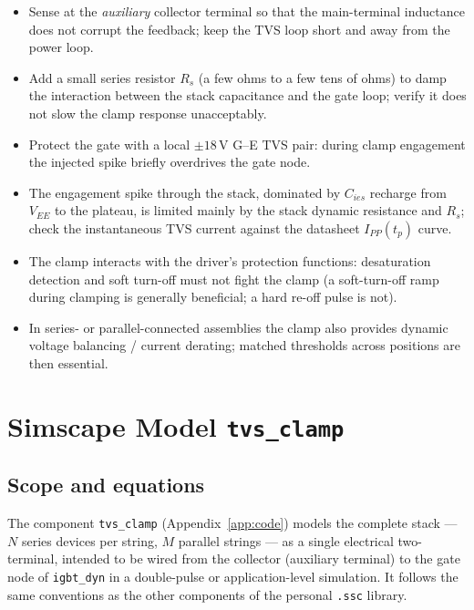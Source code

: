 \documentclass[11pt,a4paper]{article}
\begin{document}
\begin{itemize}
  \item Sense at the \emph{auxiliary} collector terminal so that the
        main-terminal inductance does not corrupt the feedback; keep
        the TVS loop short and away from the power loop.
  \item Add a small series resistor $R_s$ (a few ohms to a few tens of
        ohms) to damp the interaction between the stack capacitance and
        the gate loop; verify it does not slow the clamp response
        unacceptably.
  \item Protect the gate with a local $\pm18$\,V G--E TVS pair: during
        clamp engagement the injected spike briefly overdrives the
        gate node.
  \item The engagement spike through the stack, dominated by
        $C_{ies}$ recharge from $V_{EE}$ to the plateau, is limited
        mainly by the stack dynamic resistance and $R_s$; check the
        instantaneous TVS current against the datasheet
        $I_{PP}(t_p)$ curve.
  \item The clamp interacts with the driver's protection functions:
        desaturation detection and soft turn-off must not fight the
        clamp (a soft-turn-off ramp during clamping is generally
        beneficial; a hard re-off pulse is not).
  \item In series- or parallel-connected assemblies the clamp also
        provides dynamic voltage balancing / current derating; matched
        thresholds across positions are then essential.
\end{itemize}

\section{Simscape Model \texttt{tvs\_clamp}}

\subsection{Scope and equations}

The component \texttt{tvs\_clamp} (Appendix~\ref{app:code}) models the
complete stack --- $N$ series devices per string, $M$ parallel strings
--- as a single electrical two-terminal, intended to be wired from the
collector (auxiliary terminal) to the gate node of \texttt{igbt\_dyn}
in a double-pulse or application-level simulation. It follows the same
conventions as the other components of the personal \texttt{.ssc}
library.
\end{document}
